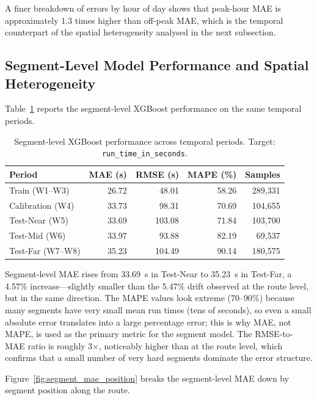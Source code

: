 A finer breakdown of errors by hour of day shows that peak-hour MAE is approximately 1.3 times higher than off-peak MAE, which is the temporal counterpart of the spatial heterogeneity analysed in the next subsection.

\subsection{Segment-Level Model Performance and Spatial Heterogeneity}
\label{subsec:segment_level_performance}

Table~\ref{tab:segment_level_performance} reports the segment-level XGBoost performance on the same temporal periods.

\begin{table}[htbp]
\centering
\caption{Segment-level XGBoost performance across temporal periods. Target: \texttt{run\_time\_in\_seconds}.}
\label{tab:segment_level_performance}
\begin{tabular}{lrrrr}
\toprule
\textbf{Period} & \textbf{MAE (s)} & \textbf{RMSE (s)} & \textbf{MAPE (\%)} & \textbf{Samples} \\
\midrule
Train (W1--W3) & 26.72 & 48.01 & 58.26 & 289,331 \\
Calibration (W4) & 33.73 & 98.31 & 70.69 & 104,655 \\
Test-Near (W5) & 33.69 & 103.08 & 71.84 & 103,700 \\
Test-Mid (W6) & 33.97 & 93.88 & 82.19 & 69,537 \\
Test-Far (W7--W8) & 35.23 & 104.49 & 90.14 & 180,575 \\
\bottomrule
\end{tabular}
\end{table}

Segment-level MAE rises from 33.69~s in Test-Near to 35.23~s in Test-Far, a 4.57\% increase---slightly smaller than the 5.47\% drift observed at the route level, but in the same direction. The MAPE values look extreme (70--90\%) because many segments have very small mean run times (tens of seconds), so even a small absolute error translates into a large percentage error; this is why MAE, not MAPE, is used as the primary metric for the segment model. The RMSE-to-MAE ratio is roughly 3$\times$, noticeably higher than at the route level, which confirms that a small number of very hard segments dominate the error structure.

Figure~\ref{fig:segment_mae_position} breaks the segment-level MAE down by segment position along the route.

